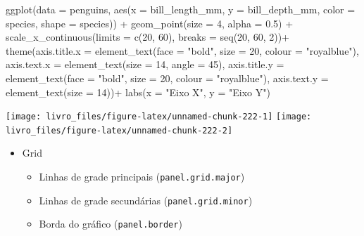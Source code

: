 \documentclass[
]{book}
\newenvironment{Shaded}{\begin{snugshade}}{\end{snugshade}}
\newcommand{\AttributeTok}[1]{\textcolor[rgb]{0.61,0.61,0.61}{#1}}
\newcommand{\DecValTok}[1]{\textcolor[rgb]{0.06,0.06,0.06}{#1}}
\newcommand{\FloatTok}[1]{\textcolor[rgb]{0.06,0.06,0.06}{#1}}
\newcommand{\FunctionTok}[1]{\textcolor[rgb]{0,0,0}{#1}}
\newcommand{\NormalTok}[1]{#1}
\newcommand{\SpecialCharTok}[1]{\textcolor[rgb]{0,0,0}{#1}}
\newcommand{\StringTok}[1]{\textcolor[rgb]{0.5,0.5,0.5}{#1}}
\begin{document}
\begin{Shaded}
\begin{Highlighting}[]
\FunctionTok{ggplot}\NormalTok{(}\AttributeTok{data =}\NormalTok{ penguins, }
       \FunctionTok{aes}\NormalTok{(}\AttributeTok{x =}\NormalTok{ bill\_length\_mm, }
           \AttributeTok{y =}\NormalTok{ bill\_depth\_mm,}
           \AttributeTok{color =}\NormalTok{ species,}
           \AttributeTok{shape =}\NormalTok{ species)) }\SpecialCharTok{+}
  \FunctionTok{geom\_point}\NormalTok{(}\AttributeTok{size =} \DecValTok{4}\NormalTok{, }\AttributeTok{alpha =} \FloatTok{0.5}\NormalTok{) }\SpecialCharTok{+}
  \FunctionTok{scale\_x\_continuous}\NormalTok{(}\AttributeTok{limits =} \FunctionTok{c}\NormalTok{(}\DecValTok{20}\NormalTok{, }\DecValTok{60}\NormalTok{), }\AttributeTok{breaks =} \FunctionTok{seq}\NormalTok{(}\DecValTok{20}\NormalTok{, }\DecValTok{60}\NormalTok{, }\DecValTok{2}\NormalTok{))}\SpecialCharTok{+}
  \FunctionTok{theme}\NormalTok{(}\AttributeTok{axis.title.x =} \FunctionTok{element\_text}\NormalTok{(}\AttributeTok{face =} \StringTok{"bold"}\NormalTok{, }\AttributeTok{size =} \DecValTok{20}\NormalTok{, }\AttributeTok{colour =} \StringTok{"royalblue"}\NormalTok{),}
        \AttributeTok{axis.text.x =} \FunctionTok{element\_text}\NormalTok{(}\AttributeTok{size =} \DecValTok{14}\NormalTok{, }\AttributeTok{angle =} \DecValTok{45}\NormalTok{),}
        \AttributeTok{axis.title.y =} \FunctionTok{element\_text}\NormalTok{(}\AttributeTok{face =} \StringTok{"bold"}\NormalTok{, }\AttributeTok{size =} \DecValTok{20}\NormalTok{, }\AttributeTok{colour =} \StringTok{"royalblue"}\NormalTok{),}
        \AttributeTok{axis.text.y =} \FunctionTok{element\_text}\NormalTok{(}\AttributeTok{size =} \DecValTok{14}\NormalTok{))}\SpecialCharTok{+}
  \FunctionTok{labs}\NormalTok{(}\AttributeTok{x =} \StringTok{"Eixo X"}\NormalTok{, }\AttributeTok{y =} \StringTok{"Eixo Y"}\NormalTok{)}
\end{Highlighting}
\end{Shaded}

\begin{center}\texttt{[image: livro\_files/figure-latex/unnamed-chunk-222-1]} \texttt{[image: livro\_files/figure-latex/unnamed-chunk-222-2]} \end{center}

\begin{itemize}
\item
  Grid

  \begin{itemize}
  \item
    Linhas de grade principais (\texttt{panel.grid.major})
  \item
    Linhas de grade secundárias (\texttt{panel.grid.minor})
  \item
    Borda do gráfico (\texttt{panel.border})
  \end{itemize}
\end{itemize}
\end{document}
